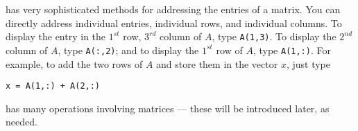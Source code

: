 \documentclass{ximera}
\begin{document}
\Matlab has very sophisticated methods for addressing the entries
of a matrix.  You can directly address individual entries,
individual rows, and individual columns.  To display the entry in
the $1^{st}$ row, $3^{rd}$ column of $A$, type {\tt A(1,3)}.  To
display the $2^{nd}$ column of $A$, type {\tt A(:,2)}; and to
display the $1^{st}$ row of $A$, type {\tt A(1,:)}.  For example,
to add the two rows of $A$ and store them in the vector $x$,
just type
\begin{verbatim}
x = A(1,:) + A(2,:)
\end{verbatim}
\index{\computer!:}

\Matlab has many operations involving matrices --- these will
be introduced later, as needed.



\end{document}
